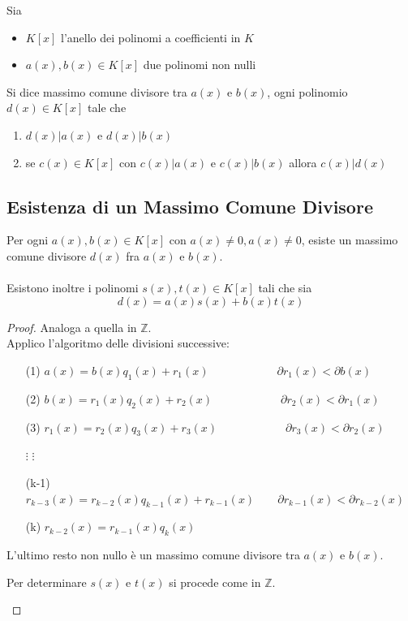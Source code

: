 \documentclass[a4paper,12pt, oneside]{book}
\begin{document}
\begin{definizione}
	Sia
	\begin{itemize}
		\item $K[x]$ l'anello dei polinomi a coefficienti in $K$
		\item $a(x), b(x) \in K[x]$ due polinomi non nulli
	\end{itemize}
	Si dice massimo comune divisore tra $a(x)$ e $b(x)$, ogni polinomio $d(x) \in K[x]$ tale che
	\begin{enumerate}
		\item $d(x) | a(x)$ e $d(x) | b(x)$
		\item se $c(x) \in K[x]$ con $c(x) | a(x)$ e $c(x) | b(x)$ allora $c(x) | d(x)$
	\end{enumerate}
\end{definizione}

\subsection{Esistenza di un Massimo Comune Divisore}
\begin{teorema}
	Per ogni $a(x), b(x) \in K[x]$ con $a(x) \not = 0, a(x) \not = 0$, esiste un massimo comune divisore $d(x)$ fra $a(x)$ e $b(x)$.\\\\
	Esistono inoltre i polinomi $s(x), t(x) \in K[x]$ tali che sia
	$$d(x) = a(x) s(x) + b(x) t(x)$$

	\begin{proof}
		Analoga a quella in $\mathbb{Z}$.\\
		Applico l'algoritmo delle divisioni successive:\\
		\begin{enumerate}
			\item[(1)] $a(x) = b(x) q_1(x) + r_1(x) \qquad \qquad \qquad \partial r_1(x) < \partial b(x)$
			\item[(2)] $b(x) = r_1(x) q_2(x) + r_2(x) \qquad \qquad \qquad \partial r_2(x) < \partial r_1(x)$
			\item[(3)] $r_1(x) = r_2(x) q_3(x) + r_3(x) \qquad \qquad \qquad \partial r_3(x) < \partial r_2(x)$
			\item[$\vdots$] $\vdots$
			\item[(k-1)] $r_{k-3}(x) = r_{k-2}(x) q_{k-1}(x) + r_{k-1}(x) \qquad \partial r_{k-1}(x) < \partial r_{k-2}(x)$
			\item[(k)] $r_{k-2}(x) = r_{k-1}(x) q_k(x)$
		\end{enumerate}
		L'ultimo resto non nullo è un massimo comune divisore tra $a(x)$ e $b(x)$.
		\begin{nota}
			Per determinare $s(x)$ e $t(x)$ si procede come in $\mathbb{Z}$.
		\end{nota}
	\end{proof}
\end{teorema}
\end{document}
